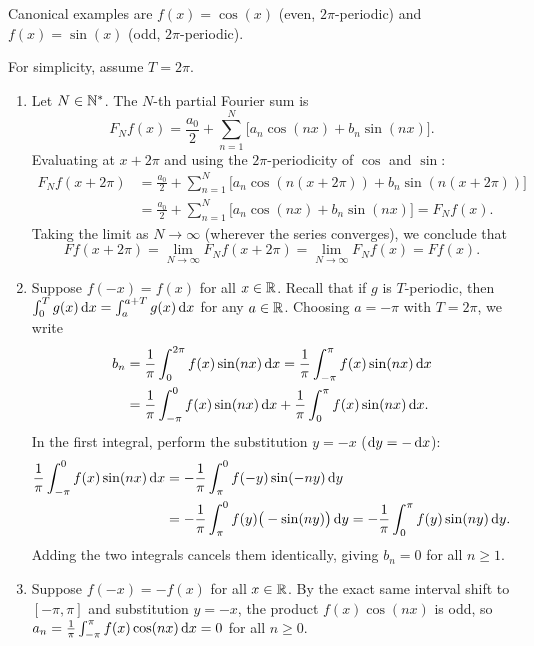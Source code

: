 \begin{remarque}
    Canonical examples are $f(x) = \cos(x)$ (even, $2\pi$-periodic) and $f(x) = \sin(x)$ (odd, $2\pi$-periodic).
\end{remarque}

\begin{demonstration}
    For simplicity, assume $T = 2\pi$.
    \begin{enumerate}
        \item[(a)] Let $N \in \mathbb{N}^*$. The $N$-th partial Fourier sum is
        \[
            F_N f(x) = \frac{a_0}{2} + \sum_{n=1}^{N} \big[ a_n \cos(nx) + b_n \sin(nx) \big].
        \]
        Evaluating at $x + 2\pi$ and using the $2\pi$-periodicity of $\cos$ and $\sin$:
        \begin{align*}
            F_N f(x + 2\pi) &= \frac{a_0}{2} + \sum_{n=1}^{N} \big[ a_n \cos(n(x + 2\pi)) + b_n \sin(n(x + 2\pi)) \big] \\
                            &= \frac{a_0}{2} + \sum_{n=1}^{N} \big[ a_n \cos(nx) + b_n \sin(nx) \big] = F_N f(x).
        \end{align*}
        Taking the limit as $N \to \infty$ (wherever the series converges), we conclude that
        \[
            Ff(x + 2\pi) = \lim_{N \to \infty} F_N f(x + 2\pi) = \lim_{N \to \infty} F_N f(x) = Ff(x).
        \]

        \item[(b)] Suppose $f(-x) = f(x)$ for all $x \in \mathbb{R}$. Recall that if $g$ is $T$-periodic, then $\int_{0}^{T} g(x) \,\mathrm{d}x = \int_{a}^{a+T} g(x) \,\mathrm{d}x$ for any $a \in \mathbb{R}$. Choosing $a = -\pi$ with $T = 2\pi$, we write
        \begin{align*}
            b_n &= \frac{1}{\pi} \int_{0}^{2\pi} f(x) \sin(nx) \,\mathrm{d}x = \frac{1}{\pi} \int_{-\pi}^{\pi} f(x) \sin(nx) \,\mathrm{d}x \\
                &= \frac{1}{\pi} \int_{-\pi}^{0} f(x) \sin(nx) \,\mathrm{d}x + \frac{1}{\pi} \int_{0}^{\pi} f(x) \sin(nx) \,\mathrm{d}x.
        \end{align*}
        In the first integral, perform the substitution $y = -x$ ($\mathrm{d} y = -\,\mathrm{d}x$):
        \begin{align*}
            \frac{1}{\pi} \int_{-\pi}^{0} f(x) \sin(nx) \,\mathrm{d}x &= -\frac{1}{\pi} \int_{\pi}^{0} f(-y) \sin(-ny) \,\mathrm{d}y \\
            &= -\frac{1}{\pi} \int_{\pi}^{0} f(y) \big(-\sin(ny)\big) \,\mathrm{d}y = -\frac{1}{\pi} \int_{0}^{\pi} f(y) \sin(ny) \,\mathrm{d}y.
        \end{align*}
        Adding the two integrals cancels them identically, giving $b_n = 0$ for all $n \ge 1$.

        \item[(c)] Suppose $f(-x) = -f(x)$ for all $x \in \mathbb{R}$. By the exact same interval shift to $[-\pi, \pi]$ and substitution $y = -x$, the product $f(x)\cos(nx)$ is odd, so $a_n = \frac{1}{\pi} \int_{-\pi}^{\pi} f(x)\cos(nx) \,\mathrm{d}x = 0$ for all $n \ge 0$.
    \end{enumerate}
\end{demonstration}

